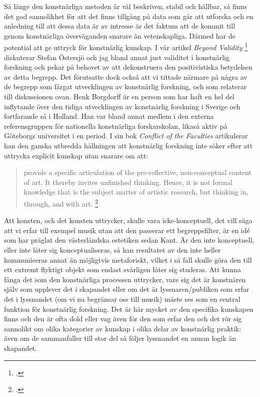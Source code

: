 \documentclass[11pt]{article}
\begin{document}
Så länge den konstnärliga metoden är väl beskriven, stabil och
hållbar, så finns det god sannolikhet för att det finns tillgång på
data som går att utforska och en anledning till att dessa data är av
intresse är det faktum att de kommit till genom konstnärliga
överväganden snarare än vetenskapliga. Därmed har de potential att ge
uttryck för konstnärlig kunskap. I vår artikel \emph{Beyond Validity}
\footcite{frisk-ost13} diskuterar Stefan Östersjö och jag bland annat
just validitet i konstnärlig forskning och pekar på behovet av att
dekonstruera den positivistiska betydelsen av detta begrepp. Det
förutsatte dock också att vi tittade närmare på några av de begrepp som färgat utvecklingen av konstnärlig forskning, och som relaterar till diskussionen ovan. Henk Borgdorff är en person som har haft en hel del inflytande över den tidiga utvecklingen av konstnärlig forskning i Sverige och fortfarande så i Holland. Han var bland annat medlem i den externa referensgruppen för nationella konstnärliga forskarskolan, likaså aktiv på Göteborgs universitet i en period. I sin bok \emph{Conflict of the Faculties} artikulerar han den ganska utbredda hållningen att konstnärlig forskning inte söker efter att uttrycka explicit kunskap utan snarare om att:

\begin{quote}
provide a specific articulation of the pre-reflective, non-conceptual content of
art. It thereby invites unfinished thinking. Hence, it is not formal knowledge that is the subject
matter of artistic research, but thinking in, through, and with art. \footcite[sid. 143]{borgdorff2012}
\end{quote}
Att konsten, och det konsten uttrycker, skulle vara icke-konceptuell,
det vill säga att vi erfar till exempel musik utan att den passerar
ett begreppsfilter, är en idé som har präglat den västerländska
estetiken sedan Kant. Är den inte konceptuell, eller inte låter sig
konceptualiseras, så kan resultatet av den inte heller kommuniceras
annat än möjligtvis metaforiskt, vilket i så fall skulle göra den till
ett extremt flyktigt objekt som endast svårligen låter sig studeras. Att kunna fånga det som den konstnärliga processen uttrycker, vare sig
det är konstnären själv som upplever det i skapandet eller om det är
lyssnaren/publiken som erfar det i lyssnandet (om vi nu begränsar oss
till musik) måste ses som en central
funktion för konstnärlig forskning. Det är här mycket av den specifika
kunskapen finns och den är ofta dold eller vag även för den som erfar
den och det rör sig sannolikt om olika kategorier av kunskap i olika
delar av konstnärlig praktik: även om de sammanfaller till stor del så
följer lyssnandet en annan logik än skapandet. 
\end{document}
